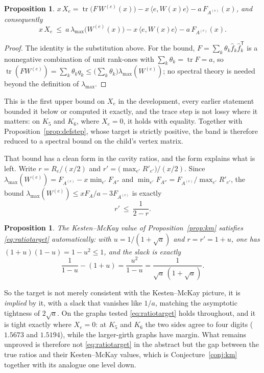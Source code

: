 \documentclass[11pt]{article}
\newtheorem{proposition}[theorem]{Proposition}
\theoremstyle{remark}
\begin{document}
\begin{proposition}\label{prop:twolevel}
$x\,X_e=\operatorname{tr}\bigl(F\,W^{(e)}(x)\bigr)-x\,\langle e,W(x)e\rangle
-a\,F_{A^{(e)}}(x)$, and consequently
\[
x\,X_e\ \le\ a\,\lambda_{\max}\bigl(W^{(e)}(x)\bigr)-x\,\langle e,W(x)e\rangle
-a\,F_{A^{(e)}}(x).
\]
\end{proposition}

\begin{proof}
The identity is the substitution above. For the bound, $F=\sum_k\theta_k\hat f_k\hat
f_k^{\mathsf T}$ is a nonnegative combination of unit rank-ones with
$\sum_k\theta_k=\operatorname{tr}F=a$, so
$\operatorname{tr}(FW^{(e)})=\sum_k\theta_kq_k\le\bigl(\sum_k\theta_k\bigr)
\lambda_{\max}(W^{(e)})$; no spectral theory is needed beyond the definition of
$\lambda_{\max}$.
\end{proof}

This is the first upper bound on $X_e$ in the development, every earlier statement
bounded it below or computed it exactly, and the trace step is not lossy where it
matters: on $K_5$ and $K_6$, where $X_e=0$, it holds with equality. Together with
Proposition~\ref{prop:defstep}, whose target is strictly positive, the band is therefore
reduced to a spectral bound on the child's vertex matrix.

That bound has a clean form in the cavity ratios, and the form explains what is left.
Write $r=R_e/(x/2)$ and $r'=\bigl(\max_{e'}R'_{e'}\bigr)/(x/2)$. Since
$\lambda_{\max}(W^{(e)})=F_{A^{(e)}}-x\min_{e'}F_{A''}$ and
$\min_{e'}F_{A''}=F_{A^{(e)}}/\max_{e'}R'_{e'}$, the bound
$\lambda_{\max}(W^{(e)})\le xF_A/a-3F_{A^{(e)}}$ is exactly
\begin{equation}\label{eq:ratiotarget}
r'\ \le\ \frac1{2-r}.
\end{equation}

\begin{proposition}\label{prop:kmtarget}
The Kesten--McKay value of Proposition~\ref{prop:km} satisfies \eqref{eq:ratiotarget}
automatically: with $u=1/(1+\sqrt a)$ and $r=r'=1+u$, one has $(1+u)(1-u)=1-u^2\le1$, and
the slack is exactly
\[
\frac1{1-u}-(1+u)=\frac{u^2}{1-u}=\frac1{\sqrt a\,(1+\sqrt a)} .
\]
\end{proposition}

So the target is not merely consistent with the Kesten--McKay picture, it is
\emph{implied} by it, with a slack that vanishes like $1/a$, matching the asymptotic
tightness of $2\sqrt a$. On the graphs tested \eqref{eq:ratiotarget} holds throughout, and
it is tight exactly where $X_e=0$: at $K_5$ and $K_6$ the two sides agree to four digits
($1.5673$ and $1.5194$), while the larger-girth graphs have margin. What remains
unproved is therefore not \eqref{eq:ratiotarget} in the abstract but the gap between the
true ratios and their Kesten--McKay values, which is Conjecture~\ref{conj:km} together
with its analogue one level down.
\end{document}
